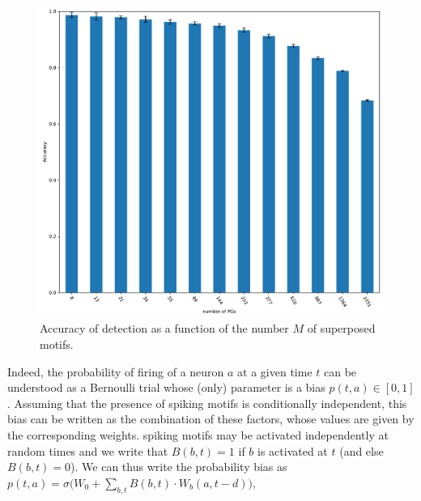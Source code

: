 \documentclass[11pt]{article}
\begin{document}
\begin{figure}
\vspace{-15pt}
\includegraphics[width=\linewidth]{figure_N_PGs.pdf}
{
\caption{Accuracy of detection as a function of the number $M$ of superposed motifs.
}
\label{fig:2}
}
\end{figure}
Indeed, the probability of firing of a neuron $a$ at a given time $t$ can be understood as a Bernoulli trial whose (only) parameter is a bias $p(t, a) \in [0, 1]$. Assuming that the presence of spiking motifs is conditionally independent, this bias can be written as the combination of these factors, whose values are given by the corresponding weights. spiking motifs may be activated independently at random times and  we write that $B(b, t)=1$ if $b$ is activated at $t$ (and else $B(b, t)=0$). We can thus write the probability bias as %
$%
p(t, a) = \sigma\big(W_0 + \sum_{b, t} B(b, t) \cdot W_b(a, t-d) \big)  
$, %
\end{document}
